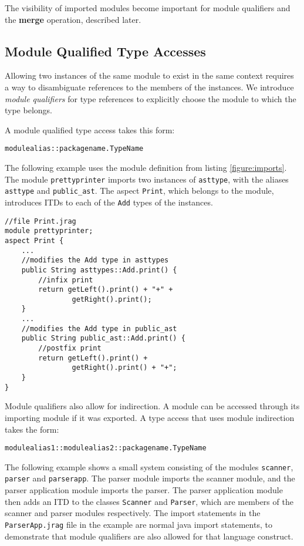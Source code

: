 The visibility of imported modules become important for module qualifiers and the \textbf{merge} operation, described later.

\subsection{Module Qualified Type Accesses}

Allowing two instances of the same module to exist in the same context
requires a way to disambiguate references to the members of the instances.
We introduce \textit{module qualifiers} for type references to explicitly
choose the module to which the type belongs.

A module qualified type access takes this form:

\begin{lstlisting}
modulealias::packagename.TypeName
\end{lstlisting}

The following example uses the module definition from listing \ref{figure:imports}.
The module \texttt{prettyprinter} imports two instances of \texttt{asttype}, with the
aliases \texttt{asttype} and \texttt{public\_ast}. The aspect \texttt{Print},
which belongs to the module, introduces ITDs to each of the \texttt{Add} types
of the instances.

\begin{lstlisting}[caption={Module Qualifiers}]
//file Print.jrag
module prettyprinter;
aspect Print {
	...
	//modifies the Add type in asttypes
	public String asttypes::Add.print() {
		//infix print
		return getLeft().print() + "+" + 
				getRight().print();
	}
	...
	//modifies the Add type in public_ast
	public String public_ast::Add.print() {
		//postfix print
		return getLeft().print() + 
				getRight().print() + "+";
	}
}
\end{lstlisting}

Module qualifiers also allow for indirection. A module can be accessed 
through its importing module if it was exported. A type access
that uses module indirection takes the form:

\begin{lstlisting}
modulealias1::modulealias2::packagename.TypeName
\end{lstlisting}

The following example
shows a small system consisting of the modules \texttt{scanner}, 
\texttt{parser} and \texttt{parserapp}. The parser module imports
the scanner module, and the parser application module imports the
parser. The parser application module then adds an ITD to the classes
\texttt{Scanner} and \texttt{Parser}, which are members of the scanner
and parser modules respectively. The import statements in the 
\texttt{ParserApp.jrag} file in the example are normal java import
statements, to demonstrate that module qualifiers are also allowed
for that language construct.

